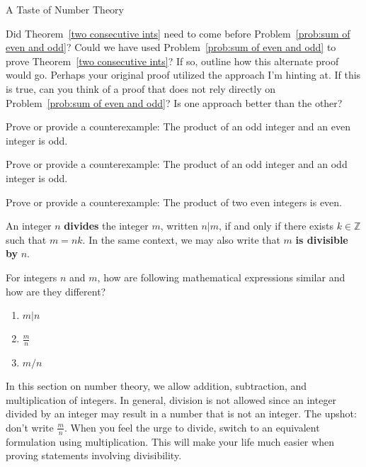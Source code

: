 \begin{section}{A Taste of Number Theory}
\begin{question}
Did Theorem~\ref{two consecutive ints} need to come before Problem~\ref{prob:sum of even and odd}?  Could we have used Problem~\ref{prob:sum of even and odd} to prove Theorem~\ref{two consecutive ints}?  If so, outline how this alternate proof would go.  Perhaps your original proof utilized the approach I'm hinting at.  If this is true, can you think of a proof that does not rely directly on Problem~\ref{prob:sum of even and odd}?  Is one approach better than the other?
\end{question}

\begin{problem}
Prove or provide a counterexample: The product of an odd integer and an even integer is odd.
\end{problem}

\begin{problem}
Prove or provide a counterexample: The product of an odd integer and an odd integer is odd.
\end{problem}

\begin{problem}
Prove or provide a counterexample: The product of two even integers is even.
\end{problem}

\begin{definition}
An integer $n$ \textbf{divides} the integer $m$, written $n|m$, if and only if there exists $k\in\mathbb{Z}$ such that $m=nk$. In the same context, we may also write that $m$ \textbf{is divisible by} $n$.
\end{definition}

\begin{question}
For integers $n$ and $m$, how are following mathematical expressions similar and how are they different?
\begin{enumerate}[label=\textrm{(\alph*)}]
\item $m|n$
\item $\displaystyle \frac{m}{n}$
\item $m/n$
\end{enumerate}
\end{question}

In this section on number theory, we allow addition, subtraction, and multiplication of integers.  In general, division is not allowed since an integer divided by an integer may result in a number that is not an integer. The upshot: don't write $\frac{m}{n}$.  When you feel the urge to divide, switch to an equivalent formulation using multiplication. This will make your life much easier when proving statements involving divisibility.


\end{section}
